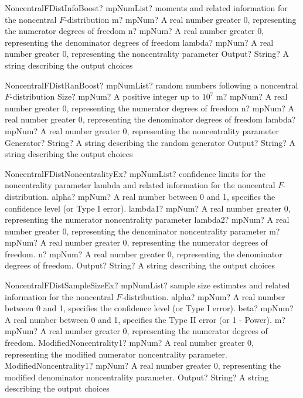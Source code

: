 \documentclass[12pt,a4paper,openany]{book}
\begin{document}
\begin{mpFunctionsExtract}
\mpFunctionFourNotImplemented
{NoncentralFDistInfoBoost? mpNumList?  moments and related information for the noncentral $F$-distribution}
{m? mpNum? A real number greater 0, representing the numerator  degrees of freedom}
{n? mpNum? A real number greater 0, representing the denominator degrees of freedom}
{lambda? mpNum? A real number greater 0, representing the noncentrality parameter}
{Output? String? A string describing the output choices}
\end{mpFunctionsExtract}

\begin{mpFunctionsExtract}
\mpFunctionSixNotImplemented
{NoncentralFDistRanBoost? mpNumList? random numbers following a noncentral $F$-distribution}
{Size? mpNum? A positive integer up to $10^7$}
{m? mpNum? A real number greater 0, representing the numerator  degrees of freedom}
{n? mpNum? A real number greater 0, representing the denominator degrees of freedom}
{lambda? mpNum? A real number greater 0, representing the noncentrality parameter}
{Generator? String? A string describing the random generator}
{Output? String? A string describing the output choices}
\end{mpFunctionsExtract}

\begin{mpFunctionsExtract}
\mpFunctionSixNotImplemented
{NoncentralFDistNoncentralityEx? mpNumList? confidence limits for the noncentrality parameter lambda and related information for the noncentral $F$-distribution.}
{alpha? mpNum? A real number between 0 and 1, specifies the confidence level (or Type I error).}
{lambda1? mpNum? A real number greater 0, representing the numerator noncentrality parameter}
{lambda2? mpNum? A real number greater 0, representing the denominator noncentrality parameter}
{m? mpNum? A real number greater 0, representing the numerator  degrees of freedom.}
{n? mpNum? A real number greater 0, representing the denominator degrees of freedom.}
{Output? String? A string describing the output choices}
\end{mpFunctionsExtract}

\begin{mpFunctionsExtract}
\mpFunctionSixNotImplemented
{NoncentralFDistSampleSizeEx? mpNumList? sample size estimates and related information for the noncentral $F$-distribution.}
{alpha? mpNum? A real number between 0 and 1, specifies the confidence level (or Type I error).}
{beta? mpNum?  A real number between 0 and 1, specifies the Type II error (or 1 - Power).}
{m? mpNum? A real number greater 0, representing the numerator  degrees of freedom.}
{ModifiedNoncentrality1? mpNum? A real number greater 0, representing the modified numerator noncentrality parameter.}
{ModifiedNoncentrality1? mpNum? A real number greater 0, representing the modified denominator noncentrality parameter.}
{Output? String? A string describing the output choices}
\end{mpFunctionsExtract}
\end{document}
